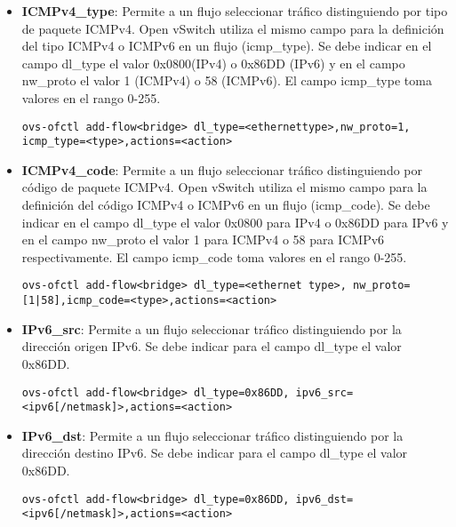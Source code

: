 \begin{itemize}

\item \textbf{ICMPv4\_type}: Permite a un flujo seleccionar tr\'afico distinguiendo por tipo de paquete ICMPv4. Open vSwitch utiliza el mismo campo para la definici\'on del tipo ICMPv4 o ICMPv6 en un flujo (icmp\_type). Se debe indicar en el campo dl\_type el valor 0x0800(IPv4) o 0x86DD (IPv6) y en el campo nw\_proto el valor 1 (ICMPv4) o 58 (ICMPv6). El campo icmp\_type toma valores en el rango 0-255.

\begin{center}
\texttt{ovs-ofctl add-flow<bridge> dl\_type=<ethernettype>,nw\_proto=1, icmp\_type=<type>,actions=<action>}
\end{center}

\item \textbf{ICMPv4\_code}: Permite a un flujo seleccionar tr\'afico distinguiendo por código de paquete ICMPv4. Open vSwitch utiliza el mismo campo para la definici\'on del c\'odigo ICMPv4 o ICMPv6 en un flujo (icmp\_code). Se debe indicar en el campo dl\_type el valor 0x0800 para IPv4 o 0x86DD para IPv6 y en el campo nw\_proto el valor 1 para ICMPv4 o 58 para ICMPv6 respectivamente. El campo icmp\_code toma valores en el rango 0-255.

\begin{center}
\texttt{ovs-ofctl add-flow<bridge> dl\_type=<ethernet type>, nw\_proto=[1|58],icmp\_code=<type>,actions=<action>}
\end{center}

\item \textbf{IPv6\_src}: Permite a un flujo seleccionar tr\'afico distinguiendo por la dirección origen IPv6. Se debe indicar para el campo dl\_type el valor 0x86DD. 

\begin{center}
\texttt{ovs-ofctl add-flow<bridge> dl\_type=0x86DD, ipv6\_src=<ipv6[/netmask]>,actions=<action>}
\end{center}

\item \textbf{IPv6\_dst}: Permite a un flujo seleccionar tr\'afico distinguiendo por la dirección destino IPv6. Se debe indicar para el campo dl\_type el valor 0x86DD. 

\begin{center}
\texttt{ovs-ofctl add-flow<bridge> dl\_type=0x86DD, ipv6\_dst=<ipv6[/netmask]>,actions=<action>}
\end{center}


\end{itemize}
